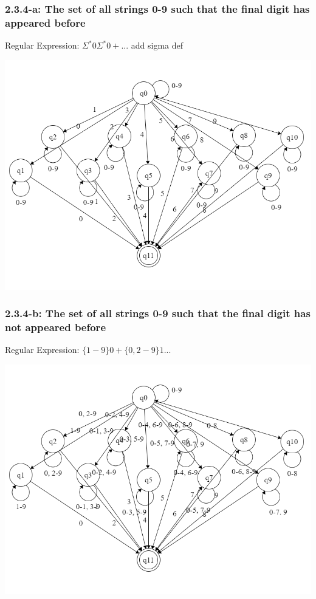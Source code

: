 \documentclass{article}
\theoremstyle{theorem}
\theoremstyle{definition}
\theoremstyle{remark}
\begin{document}
\subsubsection{2.3.4-a: The set of all strings {0-9} such that the final digit has appeared before}
Regular Expression: $\Sigma^*0\Sigma^*0+...$ add sigma def

\includegraphics[scale=0.4]{Images/2.3.4a.png}

\subsubsection{2.3.4-b: The set of all strings {0-9} such that the final digit has not appeared before}
Regular Expression: $\{1-9\}0+\{0,2-9\}1...$

\includegraphics[scale=0.4]{Images/2.3.4b.png}
\end{document}
